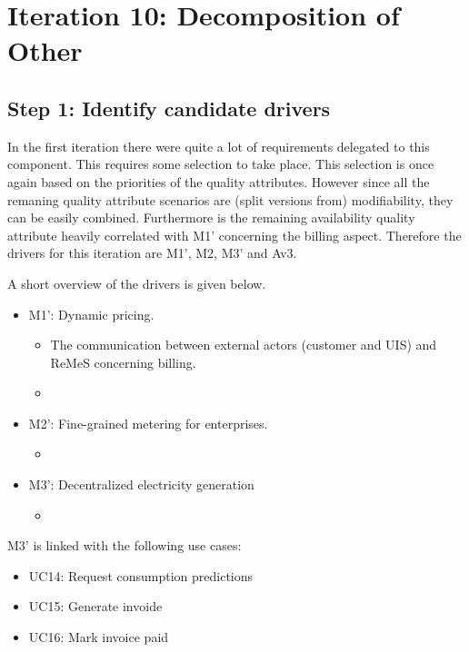 \section{Iteration 10: Decomposition of Other}
\label{add:it10}

\subsection{Step 1: Identify candidate drivers}
\label{add:it10/drivers}

\npar In the first iteration there were quite a lot of requirements delegated to
this component. This requires some selection to take place. This selection is
once again based on the priorities of the quality attributes. However since all
the remaning quality attribute scenarios are (split versions from)
modifiability, they can be easily combined. Furthermore is the remaining
availability quality attribute heavily correlated with M1' concerning the
billing aspect. Therefore the drivers for this iteration are M1', M2, M3' and
Av3.

\npar A short overview of the drivers is given below.

\begin{itemize}
 	\item M1': Dynamic pricing.
  	\begin{itemize}
    	\item The communication between external actors (customer and UIS)
    	and ReMeS concerning billing.
    	\item 
  	\end{itemize}
  	\item M2': Fine-grained metering for enterprises.
  	\begin{itemize}
  	  \item %
  	\end{itemize}
	\item M3': Decentralized electricity generation
  	\begin{itemize}
  	  \item %
  	\end{itemize}
\end{itemize}

\npar M3' is linked with the following use cases:

\begin{itemize}
  \item UC14: Request consumption predictions
  \item UC15: Generate invoide
  \item UC16: Mark invoice paid
\end{itemize}

